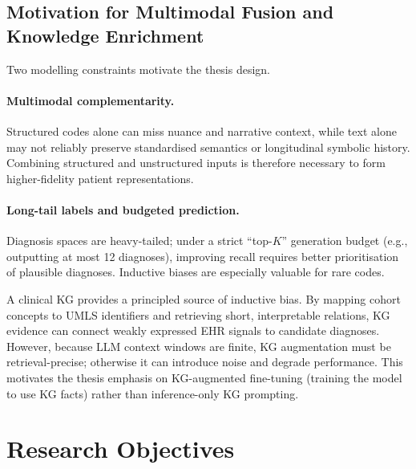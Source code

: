 \subsection{Motivation for Multimodal Fusion and Knowledge Enrichment}
\label{subsec:background-fusion-kg}

Two modelling constraints motivate the thesis design.

\paragraph{Multimodal complementarity.}
Structured codes alone can miss nuance and narrative context, while text alone may not reliably preserve standardised semantics or longitudinal symbolic history. Combining structured and unstructured inputs is therefore necessary to form higher-fidelity patient representations.

\paragraph{Long-tail labels and budgeted prediction.}
Diagnosis spaces are heavy-tailed; under a strict ``top-$K$'' generation budget (e.g., outputting at most 12 diagnoses), improving recall requires better prioritisation of plausible diagnoses. Inductive biases are especially valuable for rare codes.

A clinical KG provides a principled source of inductive bias. By mapping cohort concepts to UMLS identifiers \cite{bodenreider2004umls} and retrieving short, interpretable relations, KG evidence can connect weakly expressed EHR signals to candidate diagnoses. However, because LLM context windows are finite, KG augmentation must be retrieval-precise; otherwise it can introduce noise and degrade performance. This motivates the thesis emphasis on KG-augmented fine-tuning (training the model to use KG facts) rather than inference-only KG prompting.

\section{Research Objectives}
\label{sec:research-objectives}


